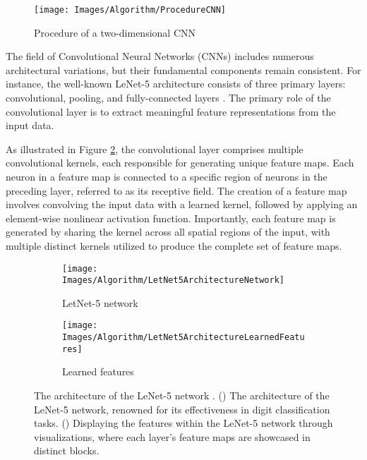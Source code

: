 \begin{figure}[h!]
	\centering
	\texttt{[image: Images/Algorithm/ProcedureCNN]}
	\caption{Procedure of a two-dimensional CNN} \label{fig:ProcedureCNN}
\end{figure}

The field of Convolutional Neural Networks (CNNs) includes numerous architectural variations, but their fundamental components remain consistent. For instance, the well-known LeNet-5 architecture consists of three primary layers: convolutional, pooling, and fully-connected layers \cite{Gu:2018}. The primary role of the convolutional layer is to extract meaningful feature representations from the input data.

As illustrated in Figure \ref{subfig:LetNet5ArchitectureNetwork}, the convolutional layer comprises multiple convolutional kernels, each responsible for generating unique feature maps. Each neuron in a feature map is connected to a specific region of neurons in the preceding layer, referred to as its receptive field. The creation of a feature map involves convolving the input data with a learned kernel, followed by applying an element-wise nonlinear activation function. Importantly, each feature map is generated by sharing the kernel across all spatial regions of the input, with multiple distinct kernels utilized to produce the complete set of feature maps.

\begin{figure}[h!]
	\centering
	
	\begin{subfigure}{0.65\textwidth}
		\texttt{[image: Images/Algorithm/LetNet5ArchitectureNetwork]}
		\caption{LetNet-5 network}    %
		\label{subfig:LetNet5ArchitectureNetwork}
	\end{subfigure}
	\hfill
	\begin{subfigure}{0.3\textwidth}
		\texttt{[image: Images/Algorithm/LetNet5ArchitectureLearnedFeatures]}
		\caption{Learned features}    %
		\label{subfig:LetNet5ArchitectureLearnedFeatures}
	\end{subfigure}
	
	\caption{The architecture of the LeNet-5 network \cite{Gu:2018}. () The architecture of the LeNet-5 network, renowned for its effectiveness in digit classification tasks. () Displaying the features within the LeNet-5 network through visualizations, where each layer's feature maps are showcased in distinct blocks.}
	\label{fig:LetNet5Architecture}
\end{figure}


